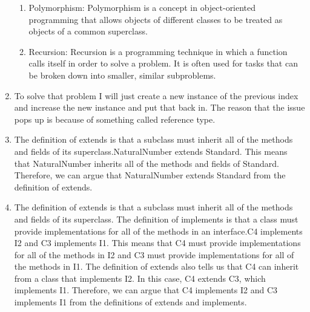 \documentclass{article}
\begin{document}
\begin{enumerate}
\begin{enumerate}
    \item Polymorphism: Polymorphism is a concept in object-oriented programming that allows objects of different classes to be treated as objects of a common superclass.
    \item Recursion: Recursion is a programming technique in which a function calls itself in order to solve a problem. It is often used for tasks that can be broken down into smaller, similar subproblems.
\end{enumerate}

\item To solve that problem I will just create a new instance of the previous index and increase the new instance and put that back in. The reason that the issue pops up is because of something called reference type.

\item The definition of extends is that a subclass must inherit all of the methods and fields of its superclass.NaturalNumber extends Standard. This means that NaturalNumber inherits all of the methods and fields of Standard. Therefore, we can argue that NaturalNumber extends Standard from the definition of extends.

\item The definition of extends is that a subclass must inherit all of the methods and fields of its superclass. The definition of implements is that a class must provide implementations for all of the methods in an interface.C4 implements I2 and C3 implements I1. This means that C4 must provide implementations for all of the methods in I2 and C3 must provide implementations for all of the methods in I1. The definition of extends also tells us that C4 can inherit from a class that implements I2. In this case, C4 extends C3, which implements I1. Therefore, we can argue that C4 implements I2 and C3 implements I1 from the definitions of extends and implements.

\end{enumerate}
\end{document}

